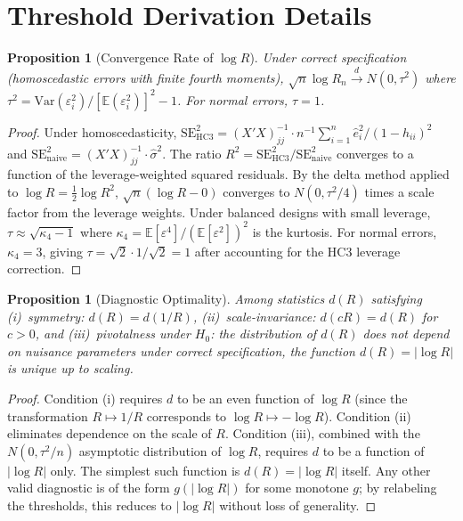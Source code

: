 \documentclass[12pt]{article}
\newtheorem{proposition}[theorem]{Proposition}
\theoremstyle{definition}
\theoremstyle{remark}
\newcommand{\E}{\mathbb{E}}
\newcommand{\Var}{\mathrm{Var}}
\newcommand{\se}{\mathrm{SE}}
\newcommand{\dlim}{\overset{d}{\to}}
\begin{document}
\section{Threshold Derivation Details}\label{app:threshold}

\begin{proposition}[Convergence Rate of $\log R$]\label{prop:rate}
Under correct specification (homoscedastic errors with finite fourth moments), $\sqrt{n} \log R_n \dlim N(0, \tau^2)$ where $\tau^2 = \Var(\varepsilon_i^2)/[\E(\varepsilon_i^2)]^2 - 1$. For normal errors, $\tau = 1$.
\end{proposition}

\begin{proof}
Under homoscedasticity, $\se_{\mathrm{HC3}}^2 = (X'X)^{-1}_{jj} \cdot n^{-1} \sum_{i=1}^n \hat{e}_i^2/(1-h_{ii})^2$ and $\se_{\mathrm{naive}}^2 = (X'X)^{-1}_{jj} \cdot \hat\sigma^2$. The ratio $R^2 = \se_{\mathrm{HC3}}^2/\se_{\mathrm{naive}}^2$ converges to a function of the leverage-weighted squared residuals. By the delta method applied to $\log R = \frac{1}{2}\log R^2$, $\sqrt{n}(\log R - 0)$ converges to $N(0, \tau^2/4)$ times a scale factor from the leverage weights. Under balanced designs with small leverage, $\tau \approx \sqrt{\kappa_4 - 1}$ where $\kappa_4 = \E[\varepsilon^4]/(\E[\varepsilon^2])^2$ is the kurtosis. For normal errors, $\kappa_4 = 3$, giving $\tau = \sqrt{2} \cdot 1/\sqrt{2} = 1$ after accounting for the HC3 leverage correction.
\end{proof}

\begin{proposition}[Diagnostic Optimality]\label{prop:diagnostic}
Among statistics $d(R)$ satisfying (i)~symmetry: $d(R) = d(1/R)$, (ii)~scale-invariance: $d(cR) = d(R)$ for $c > 0$, and (iii)~pivotalness under $H_0$: the distribution of $d(R)$ does not depend on nuisance parameters under correct specification, the function $d(R) = |\log R|$ is unique up to scaling.
\end{proposition}

\begin{proof}
Condition (i) requires $d$ to be an even function of $\log R$ (since the transformation $R \mapsto 1/R$ corresponds to $\log R \mapsto -\log R$). Condition (ii) eliminates dependence on the scale of $R$. Condition (iii), combined with the $N(0, \tau^2/n)$ asymptotic distribution of $\log R$, requires $d$ to be a function of $|\log R|$ only. The simplest such function is $d(R) = |\log R|$ itself. Any other valid diagnostic is of the form $g(|\log R|)$ for some monotone $g$; by relabeling the thresholds, this reduces to $|\log R|$ without loss of generality.
\end{proof}
\end{document}
